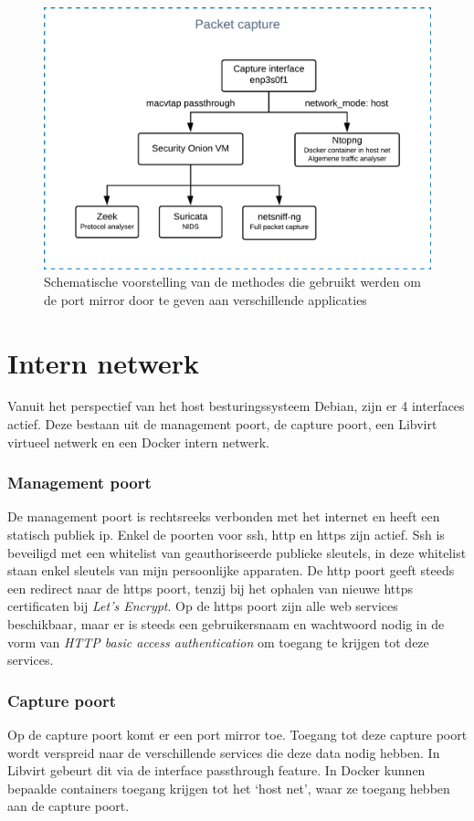 \documentclass[a4paper,12pt]{report}
\begin{document}
\begin{figure}[H]
  \centering
  \includegraphics[width=\textwidth]{aangepast-systeem-schema-pcap}
  \caption{Schematische voorstelling van de methodes die gebruikt werden om de port mirror door te geven aan verschillende applicaties}
  \label{fig:aangepast-systeem-schema-pcap}
\end{figure}

\section{Intern netwerk}
Vanuit het perspectief van het host besturingssysteem Debian, zijn er 4 interfaces actief.
Deze bestaan uit de management poort, de capture poort, een Libvirt virtueel netwerk en een Docker intern netwerk.

\subsubsection{Management poort}
De management poort is rechtsreeks verbonden met het internet en heeft een statisch publiek ip.
Enkel de poorten voor ssh, http en https zijn actief.
Ssh is beveiligd met een whitelist van geauthoriseerde publieke sleutels, in deze whitelist staan enkel sleutels van mijn persoonlijke apparaten.
De http poort geeft steeds een redirect naar de https poort, tenzij bij het ophalen van nieuwe https certificaten bij \emph{Let's Encrypt}.
Op de https poort zijn alle web services beschikbaar, maar er is steeds een gebruikersnaam en wachtwoord nodig in de vorm van \emph{HTTP basic access authentication} om toegang te krijgen tot deze services.

\subsubsection{Capture poort}
Op de capture poort komt er een port mirror toe.
Toegang tot deze capture poort wordt verspreid naar de verschillende services die deze data nodig hebben.
In Libvirt gebeurt dit via de interface passthrough feature.
In Docker kunnen bepaalde containers toegang krijgen tot het `host net', waar ze toegang hebben aan de capture poort.
\end{document}
